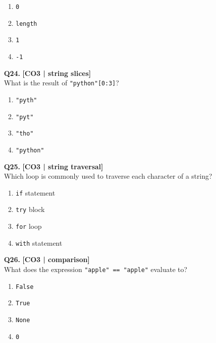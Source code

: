 \begin{enumerate}[label=(\alph*),topsep=2pt,itemsep=1pt,partopsep=0pt,parsep=0pt]
    \item \relax \texttt{0}
    \item \relax \texttt{length}
    \item \relax \texttt{1}
    \item \relax \texttt{-1}
\end{enumerate}
\vspace{{2mm}}

\noindent\textbf{Q24.} \hfill {\small\color{LPUOrange}\textbf{[CO3 | string slices]}}\\[2pt]
What is the result of \texttt{"python"[0:3]}?

\begin{enumerate}[label=(\alph*),topsep=2pt,itemsep=1pt,partopsep=0pt,parsep=0pt]
    \item \relax \texttt{"pyth"}
    \item \relax \texttt{"pyt"}
    \item \relax \texttt{"tho"}
    \item \relax \texttt{"python"}
\end{enumerate}
\vspace{{2mm}}

\noindent\textbf{Q25.} \hfill {\small\color{LPUOrange}\textbf{[CO3 | string traversal]}}\\[2pt]
Which loop is commonly used to traverse each character of a string?

\begin{enumerate}[label=(\alph*),topsep=2pt,itemsep=1pt,partopsep=0pt,parsep=0pt]
    \item \relax \texttt{if} statement
    \item \relax \texttt{try} block
    \item \relax \texttt{for} loop
    \item \relax \texttt{with} statement
\end{enumerate}
\vspace{{2mm}}

\noindent\textbf{Q26.} \hfill {\small\color{LPUOrange}\textbf{[CO3 | comparison]}}\\[2pt]
What does the expression \texttt{"apple" == "apple"} evaluate to?

\begin{enumerate}[label=(\alph*),topsep=2pt,itemsep=1pt,partopsep=0pt,parsep=0pt]
    \item \relax \texttt{False}
    \item \relax \texttt{True}
    \item \relax \texttt{None}
    \item \relax \texttt{0}
\end{enumerate}
\vspace{{2mm}}

